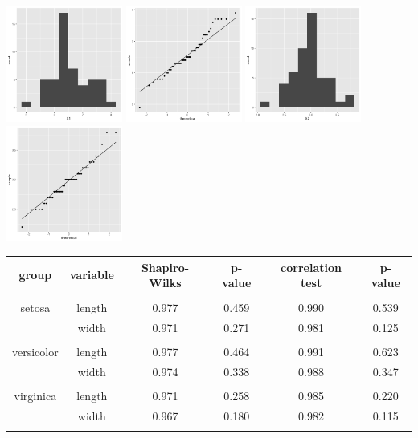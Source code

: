 \begin{center}
	\includegraphics[width=1.5in]{I_3_X1_hist.png}
	\includegraphics[width=1.5in]{I_3_X1_qq.png}
	\includegraphics[width=1.5in]{I_3_X2_hist.png}
	\includegraphics[width=1.5in]{I_3_X2_qq.png}
\end{center}

\begin{center}
\begin{tabular}{| c c | c c | c c |} 
	\hline
	group & variable & Shapiro-Wilks & p-value & correlation test & p-value \\
	\hline
	&&&&&\\
	setosa & length &  0.977 & 0.459 & 0.990 & 0.539\\
	& width &  0.971 & 0.271 & 0.981 & 0.125\\
	&&&&&\\
	versicolor & length &  0.977 & 0.464 & 0.991 & 0.623\\
	& width &  0.974 & 0.338 & 0.988 & 0.347\\
	&&&&&\\
	virginica & length &  0.971 & 0.258 & 0.985 & 0.220\\
	& width &  0.967 & 0.180 & 0.982 & 0.115\\
	&&&&&\\
	\hline
\end{tabular}
\end{center}

